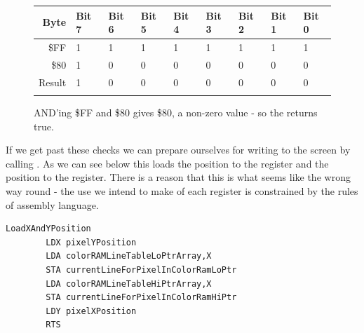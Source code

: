 \begin{figure}[H]
  {
    \setlength{\tabcolsep}{3.0pt}
    \setlength\cmidrulewidth{\heavyrulewidth} %
    \begin{adjustbox}{width=7cm,center}

      \begin{tabular}{rllllllll}
        \toprule
        Byte & Bit 7 & Bit 6 & Bit 5 & Bit 4 & Bit 3 & Bit 2 & Bit 1 & Bit 0        \\
        \midrule
        \$FF & 1 & 1 & 1 & 1 & 1 & 1 & 1 & 1 \\
        \$80 & 1 & 0 & 0 & 0 & 0 & 0 & 0 & 0 \\
        \midrule
        Result & 1 & 0 & 0 & 0 & 0 & 0 & 0 & 0 \\
        \addlinespace
        \bottomrule
      \end{tabular}
    \end{adjustbox}
    }\caption*{AND'ing \$FF and \$80 gives \$80, a non-zero value - so the  returns true.}
\end{figure}

If we get past these checks we can prepare ourselves for writing to the screen by calling . As we can
see below this loads the  position to the  register and the  position to the  register. There
is a reason that this is what seems like the wrong way round - the use we intend to make of each register is constrained by the
rules of assembly language.

\begin{lstlisting}
LoadXAndYPosition   
        LDX pixelYPosition
        LDA colorRAMLineTableLoPtrArray,X
        STA currentLineForPixelInColorRamLoPtr
        LDA colorRAMLineTableHiPtrArray,X
        STA currentLineForPixelInColorRamHiPtr
        LDY pixelXPosition
        RTS 
\end{lstlisting}

